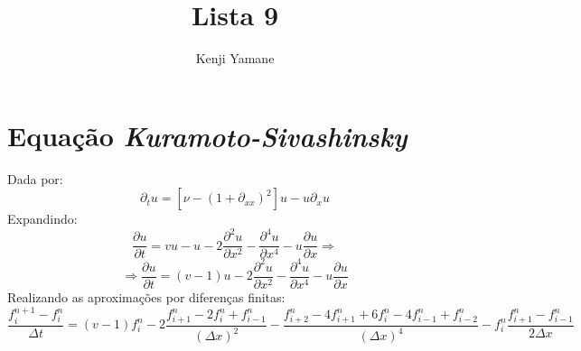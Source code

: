 \documentclass{article}[twocolumn]
\title{Lista 9}
\author{Kenji Yamane}
\begin{document}
	\maketitle
	\section{Equa\c{c}\~ao \textit{Kuramoto-Sivashinsky}}
	Dada por:
	\begin{equation}
		\partial_tu = [\nu - (1 + \partial_{xx})^2]u - u\partial_xu
		\nonumber
	\end{equation}
	Expandindo:
	\begin{equation}
		\frac{\partial u}{\partial t} = vu - u - 2\frac{\partial^2 u}{\partial x^2} -
		\frac{\partial^4 u}{\partial x^4} - u\frac{\partial u}{\partial x} \Rightarrow
		\nonumber
	\end{equation}
	\begin{equation}
		\Rightarrow \frac{\partial u}{\partial t} = (v - 1)u - 2\frac{\partial^2 u}{\partial x^2} -
		\frac{\partial^4 u}{\partial x^4} - u\frac{\partial u}{\partial x}
		\nonumber
	\end{equation}
	Realizando as aproxima\c{c}\~oes por diferen\c{c}as finitas:
	\begin{equation}
		\frac{f_i^{n + 1} - f_i^n}{\Delta t} = (v - 1)f_i^n - 2\frac{f_{i + 1}^n - 2f_i^n + f_{i - 1}^n}{(\Delta x)^2} -
		\frac{f_{i + 2}^n - 4f_{i + 1}^n + 6f_i^n - 4f_{i - 1}^n + f_{i - 2}^n}{(\Delta x)^4} - f_i^n\frac{f_{i + 1}^n - f_{i - 1}^n}{2\Delta x}
		\nonumber
	\end{equation}
\end{document}
